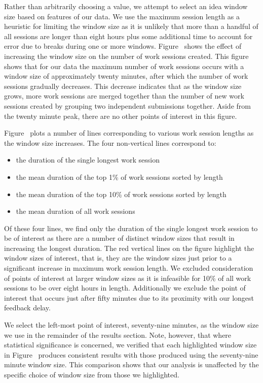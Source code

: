 Rather than arbitrarily choosing a value, we attempt to select an idea window
size based on features of our data. We use the maximum session length as a
heuristic for limiting the window size as it is unlikely that more than a
handful of all sessions are longer than eight hours plus some additional time
to account for error due to breaks during one or more
windows. Figure~ shows the effect of increasing the
window size on the number of work sessions created. This figure shows that for
our data the maximum number of work sessions occurs with a window size of
approximately twenty minutes, after which the number of work sessions gradually
decreases. This decrease indicates that as the window size grows, more work
sessions are merged together than the number of new work sessions created by
grouping two independent submissions together. Aside from the twenty minute
peak, there are no other points of interest in this figure.

Figure~ plots a number of lines corresponding to
various work session lengths as the window size increases. The four
non-vertical lines correspond to:

\begin{itemize}
\item the duration of the single longest work session
\item the mean duration of the top 1\% of work sessions sorted by length
\item the mean duration of the top 10\% of work sessions sorted by length
\item the mean duration of all work sessions
\end{itemize}

Of these four lines, we find only the duration of the single longest work
session to be of interest as there are a number of distinct window sizes that
result in increasing the longest duration. The red vertical lines on the figure
highlight the window sizes of interest, that is, they are the window sizes just
prior to a significant increase in maximum work session length. We excluded
consideration of points of interest at larger window sizes as it is infeasible
for 10\% of all work sessions to be over eight hours in length. Additionally we
exclude the point of interest that occurs just after fifty minutes due to its
proximity with our longest feedback delay.

We select the left-most point of interest, seventy-nine minutes, as the window
size we use in the remainder of the results section. Note, however, that where
statistical significance is concerned, we verified that each highlighted window
size in Figure~ produces consistent results with
those produced using the seventy-nine minute window size. This comparison shows
that our analysis is unaffected by the specific choice of window size from
those we highlighted.

